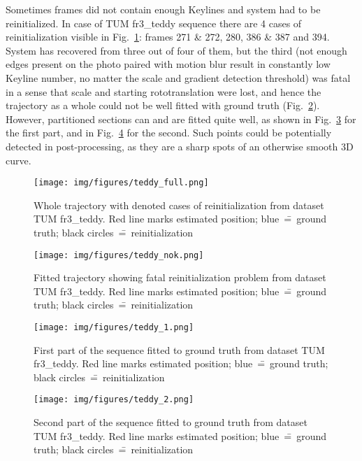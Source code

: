 Sometimes frames did not contain enough Keylines and system had to be reinitialized. In case of TUM fr3\_teddy sequence there are 4 cases of reinitialization visible in Fig.~\ref{fig:teddyfull}: frames 271 \& 272, 280, 386 \& 387 and 394. System has recovered from three out of four of them, but the third (not enough edges present on the photo paired with motion blur result in constantly low Keyline number, no matter the scale and gradient detection threshold) was fatal in a sense that scale and starting rototranslation were lost, and hence the trajectory as a whole could not be well fitted with ground truth (Fig.~\ref{fig:teddynok}). However, partitioned sections can and are fitted quite well, as shown in Fig.~\ref{fig:teddy1} for the first part, and in Fig.~\ref{fig:teddy2} for the second. Such points could be potentially detected in post-processing, as they are a sharp spots of an otherwise smooth 3D curve.

\begin{figure}[ht]
	\centering\texttt{[image: img/figures/teddy\_full.png]}
	\caption{ Whole trajectory with denoted cases of reinitialization from dataset TUM fr3\_teddy. Red line marks estimated position; blue~\==~ground truth; black circles~\==~reinitialization }
	\label{fig:teddyfull}
\end{figure}
\begin{figure}[ht]
	\centering\texttt{[image: img/figures/teddy\_nok.png]}
	\caption{ Fitted trajectory showing fatal reinitialization problem from dataset TUM fr3\_teddy. Red line marks estimated position; blue~\==~ground truth; black circles~\==~reinitialization }
	\label{fig:teddynok}
\end{figure}
\begin{figure}[ht]
	\centering\texttt{[image: img/figures/teddy\_1.png]}
	\caption{ First part of the sequence fitted to ground truth from dataset TUM fr3\_teddy. Red line marks estimated position; blue~\==~ground truth; black circles~\==~reinitialization }
	\label{fig:teddy1}
\end{figure}
\begin{figure}[ht]
	\centering\texttt{[image: img/figures/teddy\_2.png]}
	\caption{ Second part of the sequence fitted to ground truth from dataset TUM fr3\_teddy. Red line marks estimated position; blue~\==~ground truth; black circles~\==~reinitialization }
	\label{fig:teddy2}
\end{figure}

